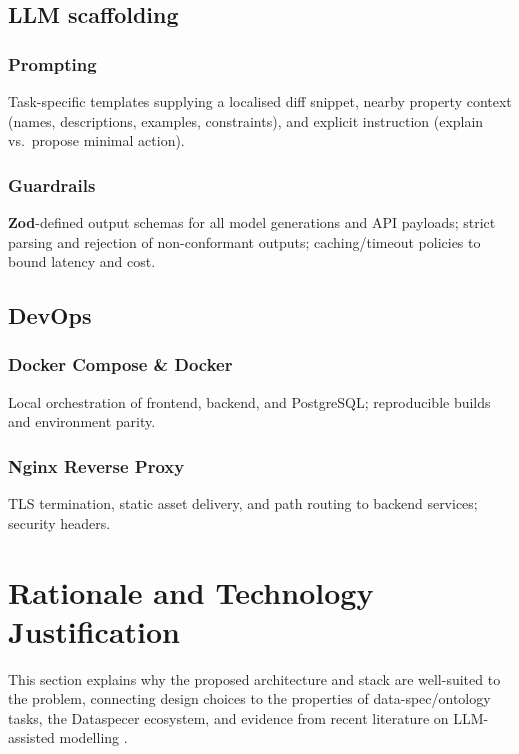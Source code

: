 \subsection*{LLM scaffolding}
\subsubsection*{Prompting}
Task-specific templates supplying a localised diff snippet, nearby property context (names, descriptions, examples, constraints), and explicit instruction (explain vs.\ propose minimal action).

\subsubsection*{Guardrails \cite{zod}}
\textbf{Zod}-defined output schemas for all model generations and API payloads; strict parsing and rejection of non-conformant outputs; caching/timeout policies to bound latency and cost.

\subsection*{DevOps}
\subsubsection*{Docker Compose \& Docker \cite{compose,docker}}
Local orchestration of frontend, backend, and PostgreSQL; reproducible builds and environment parity.

\subsubsection*{Nginx Reverse Proxy \cite{nginx}}
TLS termination, static asset delivery, and path routing to backend services; security headers.

\section{Rationale and Technology Justification}

This section explains why the proposed architecture and stack are well-suited to the problem, connecting design choices to  the properties of data-spec/ontology tasks, the Dataspecer ecosystem, and evidence from recent literature on LLM-assisted modelling \cite{fathallah2024neongpt,giglou2024llms4om,neubauer2025jsonschema,allen2024classmembership,zhang2025ontourl}.

